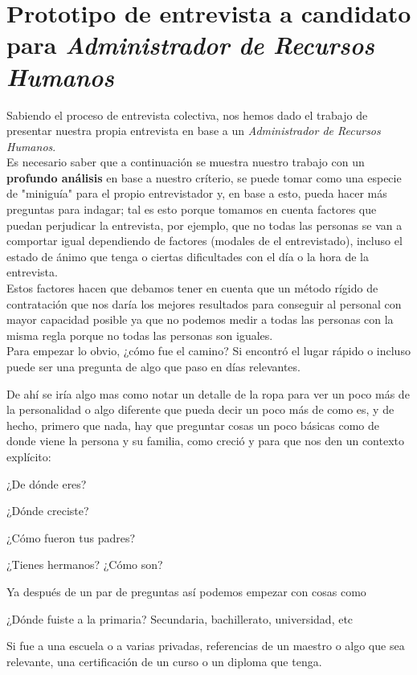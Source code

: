 \documentclass[letterpaper,12pt]{article}
\begin{document}
\begin{sloppypar}
\section{\textcolor[rgb]{0.4,0.4,0.9}{Prototipo de entrevista a candidato para \textit{Administrador de Recursos Humanos}}}
Sabiendo el proceso de entrevista colectiva, nos hemos dado el trabajo de presentar nuestra propia entrevista en base a un \textit{Administrador de Recursos Humanos}.
\vspace{0.3cm}\\ 
Es necesario saber que a continuación se muestra nuestro trabajo con un \textbf{profundo análisis} en base a nuestro críterio, se puede tomar como una especie de "miniguía" para el propio entrevistador y, en base a esto, pueda hacer más preguntas para indagar; tal es esto porque tomamos en cuenta factores que puedan perjudicar la entrevista, por ejemplo, que no todas las personas se van a comportar igual dependiendo de factores (modales de el entrevistado), incluso el estado de ánimo que tenga o ciertas dificultades con el día o la hora de la entrevista.
\vspace{0.3cm}\\ 
Estos factores hacen que debamos tener en cuenta que un método rígido de contratación que nos daría los mejores resultados para conseguir al personal con mayor capacidad posible ya que no podemos medir a todas las personas con la misma regla porque no todas las personas son iguales. 
\vspace{0.3cm}\\ 
Para empezar lo obvio, ¿cómo fue el camino? Si encontró el lugar rápido o incluso puede ser una pregunta de algo que paso en días relevantes. 

De ahí se iría algo mas como notar un detalle de la ropa para ver un poco más de la personalidad o algo diferente que pueda decir un poco más de como es, y de hecho, primero que nada, hay que preguntar cosas un poco básicas como de donde viene la persona y su familia, como creció y para que nos den un contexto explícito: 
\begin{center}
    ¿De dónde eres?

    ¿Dónde creciste?

    ¿Cómo fueron tus padres?

    ¿Tienes hermanos? ¿Cómo son?
\end{center}
Ya después de un par de preguntas así podemos empezar con cosas como
\begin{center}
    ¿Dónde fuiste a la primaria?  Secundaria, bachillerato, universidad, etc 
\end{center}
Si fue a una escuela o a varias privadas, referencias de un maestro o algo que sea relevante, una certificación de un curso o un diploma que tenga.


\end{sloppypar}
\end{document}
